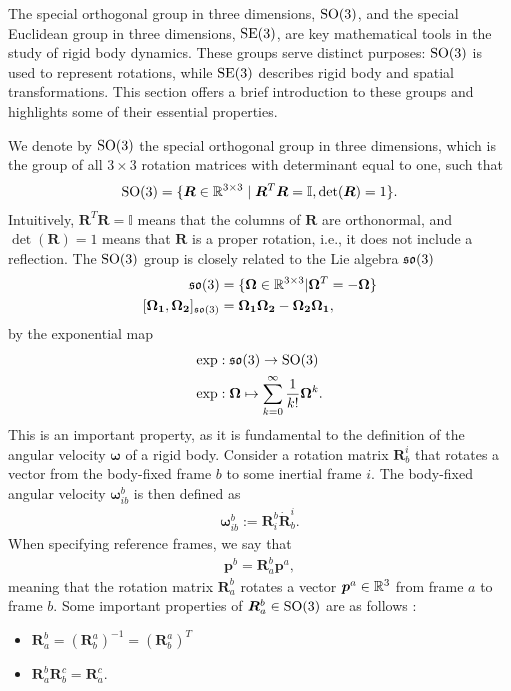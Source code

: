 The special orthogonal group in three dimensions, $\operatorname{SO}(3)$, and the special
Euclidean group in three dimensions, $\operatorname{SE}(3)$, are key mathematical tools in the
study of rigid body dynamics. These groups serve distinct purposes: $\operatorname{SO}(3)$ is
used to represent rotations, while $\operatorname{SE}(3)$ describes rigid body and spatial
transformations. This section offers a brief introduction to these groups and
highlights some of their essential properties.

We denote by $\operatorname{SO}(3)$ the special orthogonal group in three dimensions, which is
the group of all $3 \times 3$ rotation matrices with determinant equal to one,
such that
\begin{align}
    \operatorname{SO}(3) = \{ \bm{R} \in \mathbb{R}^{3 \times 3} \mid \bm{R}^T \bm{R} = \mathbb{I}, \det(\bm{R}) = 1 \}.
\end{align}
Intuitively, $\bm{R}^T \bm{R} = \mathbb{I}$ means that the columns of $\bm{R}$ are orthonormal,
and $\det(\bm{R}) = 1$ means that $\bm{R}$ is a proper rotation, i.e., it does not include
a reflection. The $\operatorname{SO}(3)$ group is closely related to the Lie algebra $\mathfrak{so}(3)$
\begin{subequations}
\begin{align}
    \mathfrak{so}(3) &= \{ \bm{\Omega} \in \mathbb{R}^{3 \times 3} | \bm{\Omega}^T = -\bm{\Omega} \} \\
    [\bm{\Omega_1}, \bm{\Omega_2}]_{\mathfrak{so}(3)} &= \bm{\Omega_1} \bm{\Omega_2}
        - \bm{\Omega_2} \bm{\Omega_1},
\end{align}
\end{subequations}
by the exponential map
\begin{subequations}
\begin{align}
    \exp &: \mathfrak{so}(3) \to \operatorname{SO}(3) \\
    \exp &: \bm{\Omega} \mapsto \sum_{k=0}^{\infty} \frac{1}{k!} \bm{\Omega}^k.
\end{align}
\end{subequations}
This is an important property, as it is fundamental to the definition of the
angular velocity $\bm{\omega}$ of a rigid body. Consider a rotation matrix
$\bm{R}_b^i$ that rotates a vector from the body-fixed frame $b$ to some inertial
frame $i$. The body-fixed angular velocity $\bm{\omega}_{ib}^b$ is then defined
as
\begin{align}
    \bm{\omega}_{ib}^b := \bm{R}_i^b \dot{\bm{R}}_b^i.
\end{align}
When specifying reference frames, we say that
\begin{align}
    \bm{p}^b = \bm{R}_{a}^b \bm{p}^a,
\end{align}
meaning that the rotation matrix $\bm{R}_{a}^b$ rotates a vector
$\bm{p}^a\in\mathbb{R}^3$ from frame $a$ to frame $b$. Some important properties
of $\bm{R}_a^b \in \operatorname{SO}(3)$ are as follows \cite{modsim}:
\begin{itemize}
\item $\bm{R}_a^b = (\bm{R}_b^a)^{-1} = (\bm{R}_b^a)^T$
\item $\bm{R}_a^b \bm{R}_b^c = \bm{R}_a^c$.
\end{itemize}

